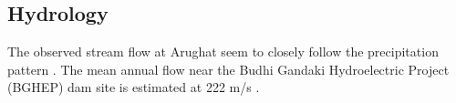 \subsection{Hydrology}
The observed stream flow at Arughat seem to closely follow the precipitation pattern \parencite{marahatta_application_2021}. The mean annual flow near the Budhi Gandaki Hydroelectric Project (BGHEP) dam site is estimated at 222 m/s \parencite{dorde_feasibility_2015}.



